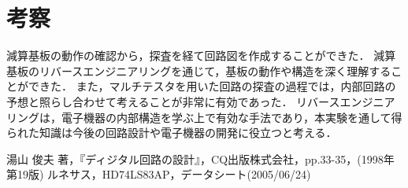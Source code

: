\documentclass[a4paper,11pt,dvipdfmx]{jsarticle}
\begin{document}
\begin{figure}[H] %
  \centering
\end{figure}

\section{考察} \label{sec:consideration}
減算基板の動作の確認から，探査を経て回路図を作成することができた．
減算基板のリバースエンジニアリングを通じて，基板の動作や構造を深く理解することができた．
また，マルチテスタを用いた回路の探査の過程では，内部回路の予想と照らし合わせて考えることが非常に有効であった．
リバースエンジニアリングは，電子機器の内部構造を学ぶ上で有効な手法であり，本実験を通して得られた知識は今後の回路設計や電子機器の開発に役立つと考える．


\begin{thebibliography}{99}
  湯山 俊夫 著，『ディジタル回路の設計』，CQ出版株式会社，pp.33-35，(1998年 第19版)
  ルネサス，HD74LS83AP，データシート(2005/06/24)
\end{thebibliography}
\end{document}
